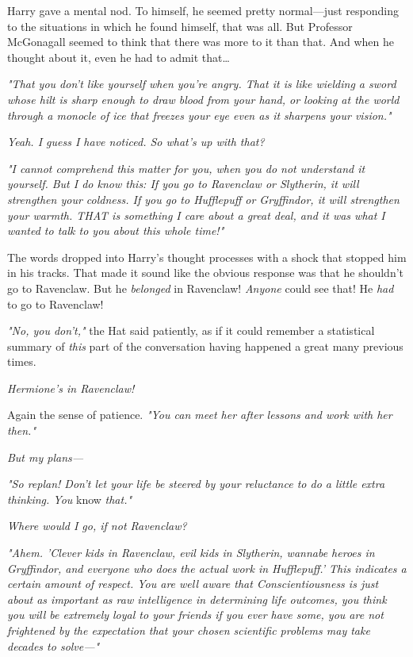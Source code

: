 Harry gave a mental nod. To himself, he seemed pretty normal---just responding 
to the situations in which he found himself, that was all. But Professor 
McGonagall seemed to think that there was more to it than that. And when he 
thought about it, even he had to admit that{\ldots}

\emph{"That you don't like yourself when you're angry. That it is like wielding 
a sword whose hilt is sharp enough to draw blood from your hand, or looking at 
the world through a monocle of ice that freezes your eye even as it sharpens 
your vision."}

\emph{Yeah. I guess I have noticed. So what's up with that?}

\emph{"I cannot comprehend this matter for you, when you do not understand it 
yourself. But I do know this: If you go to Ravenclaw or Slytherin, it will 
strengthen your coldness. If you go to Hufflepuff or Gryffindor, it will 
strengthen your warmth. THAT is something I care about a great deal, and it was 
what I wanted to talk to you about this whole time!"}

The words dropped into Harry's thought processes with a shock that stopped him 
in his tracks. That made it sound like the obvious response was that he 
shouldn't go to Ravenclaw. But he \emph{belonged} in Ravenclaw! \emph{Anyone} 
could see that! He \emph{had} to go to Ravenclaw!

\emph{"No, you don't,"} the Hat said patiently, as if it could remember a 
statistical summary of \emph{this} part of the conversation having happened a 
great many previous times.

\emph{Hermione's in Ravenclaw!}

Again the sense of patience. \emph{"You can meet her after lessons and work 
with her then."}

\emph{But my plans---}

\emph{"So replan! Don't let your life be steered by your reluctance to do a 
little extra thinking. You} know\emph{ that."}

\emph{Where would I go, if not Ravenclaw?}

\emph{"Ahem. 'Clever kids in Ravenclaw, evil kids in Slytherin, wannabe heroes 
in Gryffindor, and everyone who does the actual work in Hufflepuff.' This 
indicates a certain amount of respect. You are well aware that 
Conscientiousness is just about as important as raw intelligence in determining 
life outcomes, you think you will be extremely loyal to your friends if you 
ever have some, you are not frightened by the expectation that your chosen 
scientific problems may take decades to solve---"}

